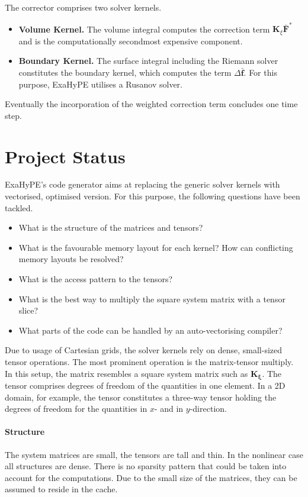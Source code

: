\documentclass{acm_proc_article-sp}
\begin{document}
The corrector comprises two solver kernels.
\begin{itemize}
\item \textbf{Volume Kernel.} The volume integral computes the correction term $\mathbf{K}_\xi \bar{\mathbf{F}}^*$ and is the computationally secondmost expensive component.
\item \textbf{Boundary Kernel.} The surface integral including the Riemann solver constitutes the boundary kernel, which computes the term $\Delta \bar{\mathbf{f}}$. For this purpose, ExaHyPE utilises a Rusanov solver.
\end{itemize}
Eventually the incorporation of the weighted correction term concludes one time step.

\section{Project Status}\label{sec:3}
ExaHyPE's code generator aims at replacing the generic solver kernels with vectorised, optimised version. For this purpose, the following questions have been tackled.
\begin{itemize}
\item What is the structure of the matrices and tensors?
\item What is the favourable memory layout for each kernel? How can conflicting memory layouts be resolved?
\item What is the access pattern to the tensors?
\item What is the best way to multiply the square system matrix with a tensor slice?
\item What parts of the code can be handled by an auto-vectorising compiler?
\end{itemize}
 
Due to usage of Cartesian grids, the solver kernels rely on dense, small-sized tensor operations. The most prominent operation is the matrix-tensor multiply. In this setup, the matrix resembles a square system matrix such as $\mathbf{K}_{\mathbf{\xi}}$. The tensor comprises degrees of freedom of the quantities in one element. In a 2D domain, for example, the tensor constitutes a three-way tensor holding the degrees of freedom for the quantities in $x$- and in $y$-direction.


\paragraph{Structure}\label{paragraph:structure}
The system matrices are small, the tensors are tall and thin. In the nonlinear case all structures are dense. There is no sparsity pattern that could be taken into account for the computations. Due to the small size of the matrices, they can be assumed to reside in the cache.
\end{document}
